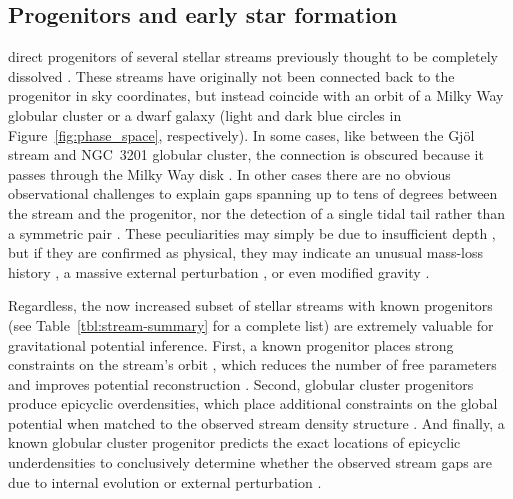 \documentclass[final,5p,times,twocolumn,authoryear]{elsarticle}
\begin{document}
\subsection{Progenitors and early star formation}
\label{sec:progenitors}
 direct progenitors of several stellar streams previously thought to be completely dissolved  \citep{palau:2019,riley:2020,ibata:2019b,ibata:2021,bonaca:2021}.
These streams have originally not been connected back to the progenitor in sky coordinates, but instead coincide with an orbit of a Milky Way globular cluster or a dwarf galaxy (light and dark blue circles in Figure~\ref{fig:phase_space}, respectively).
In some cases, like between the Gj\" ol stream and NGC~3201 globular cluster, the connection is obscured because it passes through the Milky Way disk \citep{riley:2020}.
In other cases there are no obvious observational challenges to explain gaps spanning up to tens of degrees between the stream and the progenitor, nor the detection of a single tidal tail rather than a symmetric pair \citep[e.g,][]{bonaca:2021, yang:2022b}.
These peculiarities may simply be due to insufficient depth \citep[e.g., non-detections of the low-mass stars that populate cluster tails in the early phases of dissolution,][]{balbinot:2018}, but if they are confirmed as physical, they may indicate an unusual mass-loss history \citep[e.g., due to a population of black holes in the progenitor,][]{gieles:2021,roberts:2024}, a massive external perturbation \citep[e.g., from the Galactic bar,][]{pearson:2017}, or even modified gravity \citep[causing asymmetric escape into the leading and trailing tails,][]{thomas:2018}.

Regardless, the now increased subset of stellar streams with known progenitors (see Table~\ref{tbl:stream-summary} for a complete list) are extremely valuable for gravitational potential inference.
First, a known progenitor places strong constraints on the stream's orbit \citep{bh:2018}, which reduces the number of free parameters and improves potential reconstruction \citep{palau:2023}.
Second, globular cluster progenitors produce epicyclic overdensities, which place additional constraints on the global potential when matched to the observed stream density structure \citep{kupper:2015}.
And finally, a known globular cluster progenitor predicts the exact locations of epicyclic underdensities to conclusively determine whether the observed stream gaps are due to internal evolution or external perturbation \citep[cf.][]{ibata:2020}.
\end{document}
